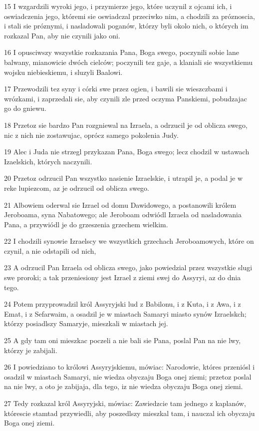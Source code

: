 \par 15 I wzgardzili wyroki jego, i przymierze jego, które uczynil z ojcami ich, i oswiadczenia jego, któremi sie oswiadczal przeciwko nim, a chodzili za próznoscia, i stali sie próznymi, i nasladowali poganów, którzy byli okolo nich, o których im rozkazal Pan, aby nie czynili jako oni.
\par 16 I opusciwszy wszystkie rozkazania Pana, Boga swego, poczynili sobie lane balwany, mianowicie dwóch cielców; poczynili tez gaje, a klaniali sie wszystkiemu wojsku niebieskiemu, i sluzyli Baalowi.
\par 17 Przewodzili tez syny i córki swe przez ogien, i bawili sie wieszczbami i wrózkami, i zaprzedali sie, aby czynili zle przed oczyma Panskiemi, pobudzajac go do gniewu.
\par 18 Przetoz sie bardzo Pan rozgniewal na Izraela, a odrzucil je od oblicza swego, nic z nich nie zostawujac, oprócz samego pokolenia Judy.
\par 19 Alec i Juda nie strzegl przykazan Pana, Boga swego; lecz chodzil w ustawach Izaelskich, których naczynili.
\par 20 Przetoz odrzucil Pan wszystko nasienie Izraelskie, i utrapil je, a podal je w reke lupiezcom, az je odrzucil od oblicza swego.
\par 21 Albowiem oderwal sie Izrael od domu Dawidowego, a postanowili królem Jeroboama, syna Nabatowego; ale Jeroboam odwiódl Izraela od nasladowania Pana, a przywiódl je do grzeszenia grzechem wielkim.
\par 22 I chodzili synowie Izraelscy we wszystkich grzechach Jeroboamowych, które on czynil, a nie odstapili od nich,
\par 23 A odrzucil Pan Izraela od oblicza swego, jako powiedzial przez wszystkie slugi swe proroki; a tak przeniesiony jest Izrael z ziemi swej do Assyryi, az do dnia tego.
\par 24 Potem przyprowadzil król Assyryjski lud z Babilonu, i z Kuta, i z Awa, i z Emat, i z Sefarwaim, a osadzil je w miastach Samaryi miasto synów Izraelskch; którzy posiadlszy Samaryje, mieszkali w miastach jej.
\par 25 A gdy tam oni mieszkac poczeli a nie bali sie Pana, poslal Pan na nie lwy, którzy je zabijali.
\par 26 I powiedziano to królowi Assyryjskiemu, mówiac: Narodowie, któres przeniósl i osadzil w miastach Samaryi, nie wiedza obyczaju Boga onej ziemi; przetoz poslal na nie lwy, a oto je zabijaja, dla tego, iz nie wiedza obyczaju Boga onej ziemi.
\par 27 Tedy rozkazal król Assyryjski, mówiac: Zawiedzcie tam jednego z kaplanów, którescie stamtad przywiedli, aby poszedlszy mieszkal tam, i nauczal ich obyczaju Boga onej ziemi.
